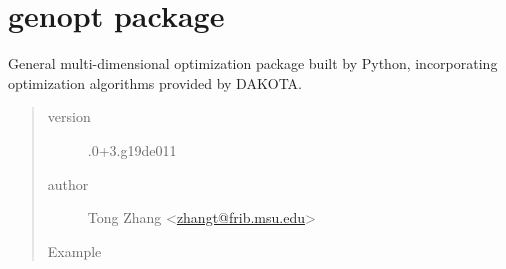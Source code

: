 \documentclass[letterpaper,10pt,english]{sphinxmanual}
\begin{document}
\section{genopt package}
\label{src/apidocs/genopt:genopt-package}\label{src/apidocs/genopt::doc}\label{src/apidocs/genopt:module-genopt}
General multi-dimensional optimization package built by Python,
incorporating optimization algorithms provided by DAKOTA.
\begin{quote}\begin{description}
\item[{version}] .0+3.g19de011

\item[{author}] \leavevmode
Tong Zhang \textless{}\href{mailto:zhangt@frib.msu.edu}{zhangt@frib.msu.edu}\textgreater{}

\item[{Example}] \leavevmode
\end{description}\end{quote}
\end{document}
